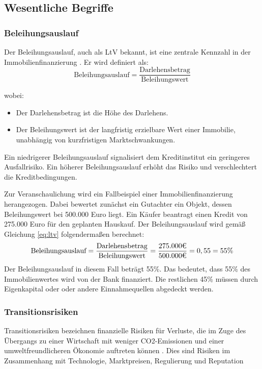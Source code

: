\subsection{Wesentliche Begriffe}
\subsubsection{Beleihungsauslauf}
Der Beleihungsauslauf, auch als \ac{LtV} bekannt, ist eine zentrale Kennzahl in der Immobilienfinanzierung \parencite{BelWertV_3}. Er wird definiert als:
\begin{equation}
    \text{Beleihungsauslauf} = \frac{\text{Darlehensbetrag}}{\text{Beleihungswert}}
    \label{eq:ltv}
\end{equation}

\noindent wobei:
\begin{itemize}
    \item Der Darlehensbetrag ist die Höhe des Darlehens.
    \item Der Beleihungswert ist der langfristig erzielbare Wert einer Immobilie, unabhängig von kurzfristigen Marktschwankungen.
\end{itemize}

Ein niedrigerer Beleihungsauslauf signalisiert dem Kreditinstitut ein geringeres Ausfallrisiko. Ein höherer Beleihungsauslauf erhöht das Risiko und verschlechtert die Kreditbedingungen.

Zur Veranschaulichung wird ein Fallbeispiel einer Immobilienfinanzierung herangezogen. Dabei bewertet zunächst ein Gutachter ein Objekt, dessen Beleihungswert bei 500.000 Euro liegt. Ein Käufer beantragt einen Kredit von 275.000 Euro für den geplanten Hauskauf.
Der Beleihungsauslauf wird gemäß Gleichung \ref{eq:ltv} folgendermaßen berechnet:
\begin{equation}
    \text{Beleihungsauslauf} = \frac{\text{Darlehensbetrag}}{\text{Beleihungswert}} = \frac{275.000 \mbox{\texteuro}}{500.000 \mbox{\texteuro}} = 0,55 = 55\%
\end{equation}
Der Beleihungsauslauf in diesem Fall beträgt 55\%. Das bedeutet, dass 55\% des Immobilienwertes wird von der Bank finanziert. Die restlichen 45\% müssen durch Eigenkapital oder oder andere Einnahmequellen abgedeckt werden.
\subsubsection{Transitionsrisiken}
Transitionsrisiken bezeichnen finanzielle Risiken für Verluste, die im Zuge des Übergangs zu einer Wirtschaft mit weniger CO2-Emissionen und einer umweltfreundlicheren Ökonomie auftreten können \parencite{ecb2020climate}. Dies sind Risiken im Zusammenhang mit Technologie, Marktpreisen, Regulierung und Reputation

